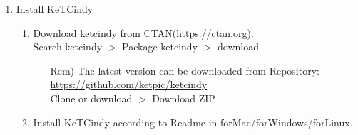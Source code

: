 \documentclass{article}
\begin{document}
\begin{enumerate}[\bf\large 1.]
\item Install KeTCindy
  \begin{enumerate}[(1)]
  \item Download ketcindy from CTAN(\url{https://ctan.org}).\\
  \hspace*{10mm}Search ketcindy $>$ Pack­age ketcindy $>$ download
    \begin{itemize}
    \item[Rem)]The latest version can be downloaded from Repository:\\
        \hspace*{5mm}\url{https://github.com/ketpic/ketcindy}\\
        \hspace*{10mm}Clone or download $>$ Download ZIP
    \end{itemize}
  \item Install KeTCindy according to Readme in forMac/forWindows/forLinux.
  \end{enumerate}
\end{enumerate}
\end{document}
